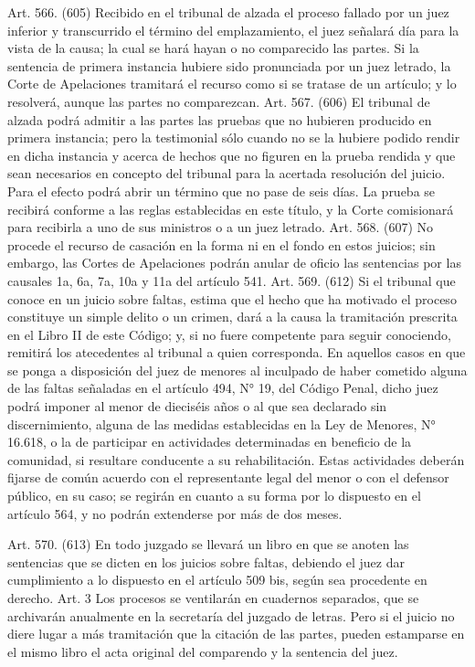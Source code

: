     Art. 566. (605) Recibido en el tribunal de alzada el proceso fallado por un juez inferior y transcurrido el término del emplazamiento, el juez señalará día para la vista de la causa; la cual se hará hayan o no comparecido las partes.
    Si la sentencia de primera instancia hubiere sido pronunciada por un juez letrado, la Corte de Apelaciones tramitará el recurso como si se tratase de un artículo; y lo resolverá, aunque las partes no comparezcan.
    Art. 567. (606) El tribunal de alzada podrá admitir a las partes las pruebas que no hubieren producido en primera instancia; pero la testimonial sólo cuando no se la hubiere podido rendir en dicha instancia y acerca de hechos que no figuren en la prueba rendida y que sean necesarios en concepto del tribunal para la acertada resolución del juicio.
    Para el efecto podrá abrir un término que no pase de seis días. La prueba se recibirá conforme a las reglas establecidas en este título, y la Corte comisionará para recibirla a uno de sus ministros o a un juez letrado.
    Art. 568. (607) No procede el recurso de casación en la forma ni en el fondo en estos juicios; sin embargo, las Cortes de Apelaciones podrán anular de oficio las sentencias por las causales 1a, 6a, 7a, 10a y 11a del artículo 541.
    Art. 569. (612) Si el tribunal que conoce en un juicio sobre faltas, estima que el hecho que ha motivado el proceso constituye un simple delito o un crimen, dará a la causa la tramitación prescrita en el Libro II de este Código; y, si no fuere competente para seguir conociendo, remitirá los atecedentes al tribunal a quien corresponda.
    En aquellos casos en que se ponga a disposición del juez de menores al inculpado de haber cometido alguna de las faltas señaladas en el artículo 494, N° 19, del Código Penal, dicho juez podrá imponer al menor de dieciséis años o al que sea declarado sin discernimiento, alguna de las medidas establecidas en la Ley de Menores, N° 16.618, o la de participar en actividades determinadas en beneficio de la comunidad, si resultare conducente a su rehabilitación. Estas actividades deberán fijarse de común acuerdo con el representante legal del menor o con el defensor público, en su caso; se regirán en cuanto a su forma por lo dispuesto en el artículo 564, y no podrán extenderse por más de dos meses.

    Art. 570. (613) En todo juzgado se llevará un libro en que se anoten las sentencias que se dicten en los juicios sobre faltas, debiendo el juez dar cumplimiento a lo dispuesto en el artículo 509 bis, según sea procedente en derecho.                                    Art. 3
    Los procesos se ventilarán en cuadernos separados, que se archivarán anualmente en la secretaría del juzgado de letras.
    Pero si el juicio no diere lugar a más tramitación que la citación de las partes, pueden estamparse en el mismo libro el acta original del comparendo y la sentencia del juez.

